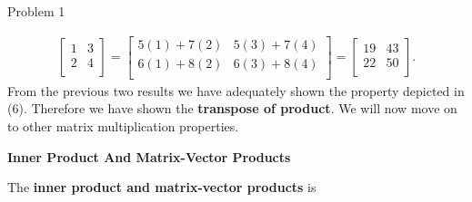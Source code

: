 \begin{problem}{Problem 1}
\begin{highlight}[Solution]
\begin{align*}
\begin{bmatrix}
                1 & 3 \\
                2 & 4 \\
            \end{bmatrix}
            = 
            \begin{bmatrix}
                5(1) + 7(2) & 5(3) + 7(4) \\
                6(1) + 8(2) & 6(3) + 8(4) \\
            \end{bmatrix}
            = 
            \begin{bmatrix}
                19 & 43 \\
                22 & 50 \\
            \end{bmatrix}.
        \end{align*}
        From the previous two results we have adequately shown the property depicted in (6). Therefore we have shown the \textbf{transpose of product}. We will now move on to other matrix multiplication
        properties. \vspace*{1em}

        \noindent \textbf{Inner Product And Matrix-Vector Products} \vspace*{1em}

        The \textbf{inner product and matrix-vector products} is 


\end{highlight}
\end{problem}
